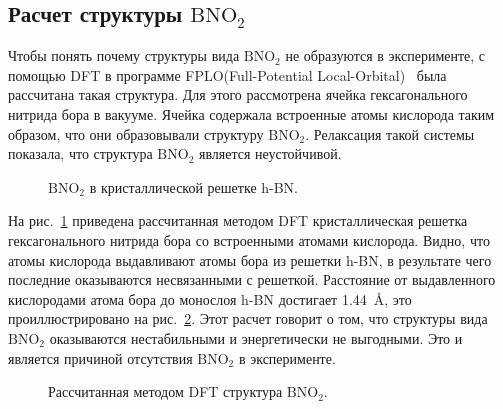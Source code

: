 \subsection{Расчет структуры \textbf{$\mathrm{BNO_2}$}}
Чтобы понять почему структуры вида $\mathrm{BNO_2}$ не образуются в эксперименте, с помощью DFT в программе
FPLO(Full-Potential Local-Orbital)~\cite{Koepernik1999} была рассчитана такая структура. Для этого рассмотрена ячейка гексагонального 
нитрида бора в вакууме. Ячейка содержала встроенные атомы кислорода таким образом, что они образовывали структуру
$\mathrm{BNO_2}$. Релаксация такой системы показала, что структура $\mathrm{BNO_2}$ является неустойчивой. 
\begin{figure}[!ht]
\begin{minipage}[h]{0.49\linewidth}
\end{minipage}
\hfill
\begin{minipage}[!ht]{0.49\linewidth}
\end{minipage}
\caption{$\mathrm{BNO_2}$ в кристаллической решетке h-BN.}
\label{BNO2_relaxed}
\end{figure}
На рис.~\ref{BNO2_relaxed} приведена рассчитанная методом DFT кристаллическая решетка гексагонального нитрида бора 
со встроенными атомами кислорода. Видно, что атомы кислорода выдавливают атомы бора из решетки h-BN, в результате чего
последние оказываются несвязанными с решеткой. Расстояние от выдавленного кислородами  атома бора до монослоя h-BN
достигает 1.44~\AA, это проиллюстрировано на рис.~\ref{pic:BNO2_B_height}. Этот расчет говорит о том, что структуры
вида $\mathrm{BNO_2}$ оказываются нестабильными и энергетически не выгодными. Это и является причиной отсутствия 
$\mathrm{BNO_2}$ в эксперименте.
\begin{figure}[!ht]
\caption{Рассчитанная методом DFT структура $\mathrm{BNO_2}$.}
\label{pic:BNO2_B_height}
\end{figure}



\clearpage
